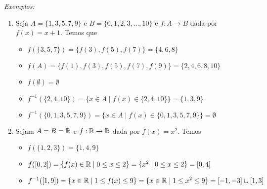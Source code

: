 {\it Exemplos:}
\begin{enumerate}
	\item Seja $A = \{1, 3, 5, 7, 9 \}$ e $B = \{0, 1, 2, 3, \dots, 10\}$ e $f : A \to B$ dada por $f(x) = x + 1$. Temos que
	\begin{itemize}
		\item $f(\{3, 5, 7\}) = \{f(3), f(5), f(7)\} = \{4, 6, 8\}$

		\item $f(A) = \{f(1), f(3), f(5), f(7), f(9)\} = \{2, 4, 6, 8, 10\}$

		\item $f(\emptyset) = \emptyset$

		\item $f^{-1}(\{2, 4, 10\}) = \{x \in A \mid f(x) \in \{2, 4, 10\}\} = \{1, 3, 9\}$

		\item $f^{-1}(\{0, 1, 3, 5, 7, 9\}) = \{x \in A \mid f(x) \in \{0, 1, 3, 5, 7, 9\}\} = \emptyset$
	\end{itemize}

	\item Sejam $A = B= \mathbb{R}$ e $f : \mathbb{R} \to \mathbb{R}$ dada por $f(x) = x^2$. Temos
	\begin{itemize}
		\item $f(\{1, 2, 3\}) = \{1, 4, 9\}$

		\item $f([0,2]) = \{f(x) \in \mathbb{R} \mid 0 \le x \le 2 \} = \{x^2 \mid 0 \le x \le 2\} = [0, 4]$

		\item $f^{-1}([1, 9]) = \{ x \in \mathbb{R} \mid 1 \le f(x) \le 9\} = \{x \in \mathbb{R} \mid 1 \le x^2 \le 9\} = [-1, -3] \cup [1, 3]$
	\end{itemize}
\end{enumerate}

